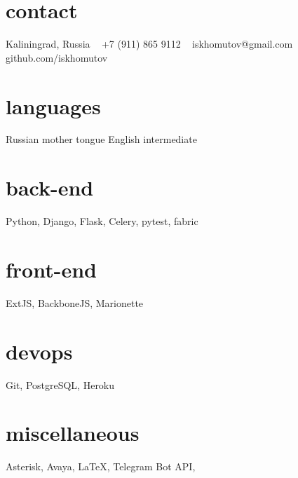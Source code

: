 \documentclass[]{cv-style}
\begin{document}


\begin{aside}
%
%
\section{contact}
Kaliningrad, Russia
~
+7 (911) 865 9112
~
iskhomutov@gmail.com
~
github.com/iskhomutov
%
\section{languages}
Russian mother tongue
English intermediate
%
\section{back-end}
Python, Django, Flask, Celery, pytest, fabric
%
\section{front-end}
ExtJS, BackboneJS, Marionette
%
\section{devops}
Git, PostgreSQL, Heroku
%
\section{miscellaneous}
Asterisk, Avaya, \LaTeX{}, Telegram Bot API, 
%
\end{aside}
\end{document}
